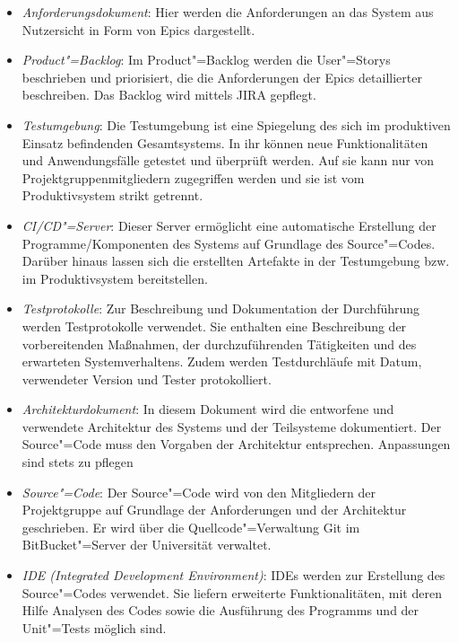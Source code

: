 \begin{itemize}
    \item	\textit{Anforderungsdokument}: Hier werden die Anforderungen an das System aus Nutzersicht in Form von Epics dargestellt.
    \item	\textit{Product"=Backlog}: Im Product"=Backlog werden die User"=Storys beschrieben und priorisiert, die die Anforderungen der Epics detaillierter beschreiben. Das Backlog wird mittels JIRA gepflegt.
    \item	\textit{Testumgebung}: Die Testumgebung ist eine Spiegelung des sich im produktiven Einsatz befindenden Gesamtsystems. In ihr können neue Funktionalitäten und Anwendungsfälle getestet und überprüft werden. Auf sie kann nur von Projektgruppenmitgliedern zugegriffen werden und sie ist vom Produktivsystem strikt getrennt.
    \item	\textit{CI/CD"=Server}: Dieser Server ermöglicht eine automatische Erstellung der Programme/Komponenten des Systems auf Grundlage des Source"=Codes. Darüber hinaus lassen sich die erstellten Artefakte in der Testumgebung bzw. im Produktivsystem bereitstellen.
    \item	\textit{Testprotokolle}: Zur Beschreibung und Dokumentation der Durchführung werden Testprotokolle verwendet. Sie enthalten eine Beschreibung der vorbereitenden Maßnahmen, der durchzuführenden Tätigkeiten und des erwarteten Systemverhaltens. Zudem werden Testdurchläufe mit Datum, verwendeter Version und Tester protokolliert.
    \item	\textit{Architekturdokument}: In diesem Dokument wird die entworfene und verwendete Architektur des Systems und der Teilsysteme dokumentiert. Der Source"=Code muss den Vorgaben der Architektur entsprechen. Anpassungen sind stets zu pflegen
    \item	\textit{Source"=Code}: Der Source"=Code wird von den Mitgliedern der Projektgruppe auf Grundlage der Anforderungen und der Architektur geschrieben. Er wird über die Quellcode"=Verwaltung Git im BitBucket"=Server der Universität verwaltet.
    \item	\textit{IDE (Integrated Development Environment)}: IDEs werden zur Erstellung des Source"=Codes verwendet. Sie liefern erweiterte Funktionalitäten, mit deren Hilfe Analysen des Codes sowie die Ausführung des Programms und der Unit"=Tests möglich sind.
\end{itemize}


